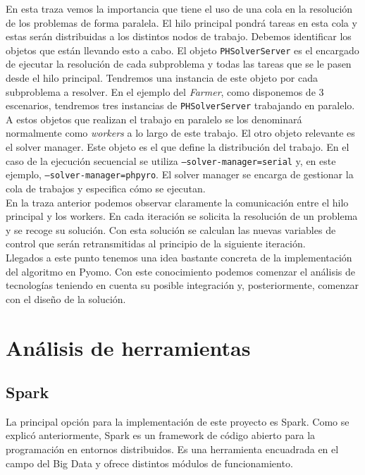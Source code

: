 En esta traza vemos la importancia que tiene el uso de una cola en la resolución de los problemas de forma paralela. El hilo principal pondrá tareas en esta cola y estas serán distribuidas a los distintos nodos de trabajo. Debemos identificar los objetos que están llevando esto a cabo. El objeto \texttt{PHSolverServer} es el encargado de ejecutar la resolución de cada subproblema y todas las tareas que se le pasen desde el hilo principal. Tendremos una instancia de este objeto por cada subproblema a resolver. En el ejemplo del \textit{Farmer}, como disponemos de 3 escenarios, tendremos tres instancias de \texttt{PHSolverServer} trabajando en paralelo. A estos objetos que realizan el trabajo en paralelo se los denominará normalmente como \textit{workers} a lo largo de este trabajo. El otro objeto relevante es el solver manager. Este objeto es el que define la distribución del trabajo. En el caso de la ejecución secuencial se utiliza \texttt{--solver-manager=serial} y, en este ejemplo, \texttt{--solver-manager=phpyro}. El solver manager se encarga de gestionar la cola de trabajos y especifica cómo se ejecutan.\\

En la traza anterior podemos observar claramente la comunicación entre el hilo principal y los workers. En cada iteración se solicita la resolución de un problema y se recoge su solución. Con esta solución se calculan las nuevas variables de control que serán retransmitidas al principio de la siguiente iteración. \\

Llegados a este punto tenemos una idea bastante concreta de la implementación del algoritmo en Pyomo. Con este conocimiento podemos comenzar el análisis de tecnologías teniendo en cuenta su posible integración y, posteriormente, comenzar con el diseño de la solución.

\section{Análisis de herramientas}
\label{sec:herramientasAlternativas}

\subsection{Spark}


La principal opción para la implementación de este proyecto es Spark. Como se explicó anteriormente, Spark es un framework de código abierto para la programación en entornos distribuidos. Es una herramienta encuadrada en el campo del Big Data y ofrece distintos módulos de funcionamiento.\\


